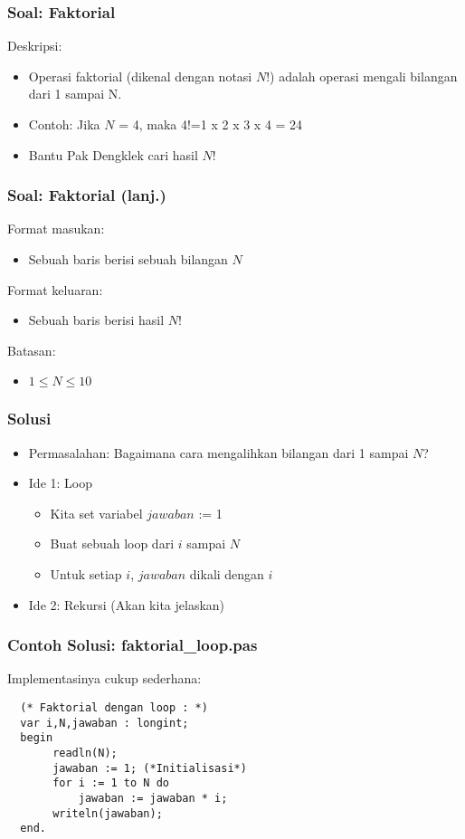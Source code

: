\documentclass{beamer}
\begin{document}
\begin{frame}
\frametitle{Soal: Faktorial}
Deskripsi:
\begin{itemize}
        \item Operasi faktorial (dikenal dengan notasi $N$!) adalah operasi mengali bilangan dari 1 sampai N.
        \item Contoh: Jika $N$ = 4, maka 4!=1 x 2 x 3 x 4 = 24
        \item Bantu Pak Dengklek cari hasil $N$!
\end{itemize}
\end{frame}

\begin{frame}
\frametitle{Soal: Faktorial (lanj.) }
Format masukan:
\begin{itemize}
        \item Sebuah baris berisi sebuah bilangan $N$
\end{itemize}
Format keluaran:
\begin{itemize}
        \item Sebuah baris berisi hasil $N$!
\end{itemize}
Batasan:
\begin{itemize}
        \item $1 \le N \le 10$
\end{itemize}
\end{frame}

\begin{frame}
\frametitle{Solusi}
\begin{itemize}
        \item Permasalahan: Bagaimana cara mengalihkan bilangan dari 1 sampai $N$?
    \item Ide 1: Loop
    \begin{itemize}
       \item Kita set variabel $jawaban$ := 1
       \item Buat sebuah loop dari $i$ sampai $N$
       \item Untuk setiap $i$, $jawaban$ dikali dengan $i$
   \end{itemize}
   \item Ide 2: Rekursi (Akan kita jelaskan)
\end{itemize}
\end{frame}

\begin{frame}[fragile]
\frametitle{Contoh Solusi: faktorial\_loop.pas}
Implementasinya cukup sederhana:
\begin{lstlisting}
  (* Faktorial dengan loop : *)
  var i,N,jawaban : longint;
  begin
       readln(N);
       jawaban := 1; (*Initialisasi*)
       for i := 1 to N do
           jawaban := jawaban * i;
       writeln(jawaban);
  end.
\end{lstlisting}
\end{frame}
\end{document}
